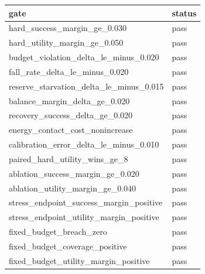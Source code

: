 \begin{tabular}{ll}
\toprule
gate & status \\
\midrule
hard\_success\_margin\_ge\_0.030 & pass \\
hard\_utility\_margin\_ge\_0.050 & pass \\
budget\_violation\_delta\_le\_minus\_0.020 & pass \\
fall\_rate\_delta\_le\_minus\_0.020 & pass \\
reserve\_starvation\_delta\_le\_minus\_0.015 & pass \\
balance\_margin\_delta\_ge\_0.020 & pass \\
recovery\_success\_delta\_ge\_0.020 & pass \\
energy\_contact\_cost\_nonincrease & pass \\
calibration\_error\_delta\_le\_minus\_0.010 & pass \\
paired\_hard\_utility\_wins\_ge\_8 & pass \\
ablation\_success\_margin\_ge\_0.020 & pass \\
ablation\_utility\_margin\_ge\_0.040 & pass \\
stress\_endpoint\_success\_margin\_positive & pass \\
stress\_endpoint\_utility\_margin\_positive & pass \\
fixed\_budget\_breach\_zero & pass \\
fixed\_budget\_coverage\_positive & pass \\
fixed\_budget\_utility\_margin\_positive & pass \\
\bottomrule
\end{tabular}
